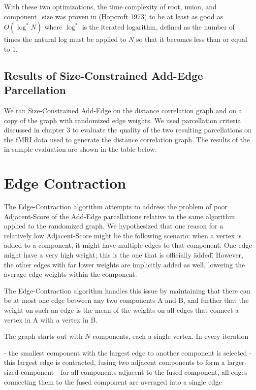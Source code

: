 With these two optimizations, the time complexity of root, union, and
component\_size was proven in (Hopcroft 1973) to be at least as good as
$O(\log^* N)$ where $\log^*$ is the iterated logarithm, defined as the
number of times the natural log must be applied to $N$ so that it
becomes less than or equal to 1.

\subsection{Results of Size-Constrained Add-Edge Parcellation}

We ran Size-Constrained Add-Edge on the distance correlation graph and
on a copy of the graph with randomized edge weights. We used
parcellation criteria discussed in chapter 3 to evaluate the quality of
the two resulting parcellations on the fMRI data used to generate the
distance correlation graph. The results of the in-sample evaluation are
shown in the table below:



\section{Edge Contraction}

The Edge-Contraction algorithm attempts to address the problem of poor
Adjacent-Score of the Add-Edge parcellations relative to the same
algorithm applied to the randomized graph. We hypothesized that one
reason for a relatively low Adjacent-Score might be the following
scenario: when a vertex is added to a component, it might have multiple
edges to that component. One edge might have a very high weight; this is
the one that is officially \"added\". However, the other edges with far
lower weights are implicitly added as well, lowering the average edge
weights within the component.

The Edge-Contraction algorithm handles this issue by maintaining that
there can be at most one edge between any two components A and B, and
further that the weight on such an edge is the mean of the weights on
all edges that connect a vertex in A with a vertex in B.

The graph starts out with $N$ components, each a single vertex. In every
iteration

- the smallest component with the largest edge to another component is selected
- this largest edge is contracted, fusing two adjacent components to form a larger-sized component
- for all components adjacent to the fused component, all edges connecting them to the fused component are averaged into a single edge

